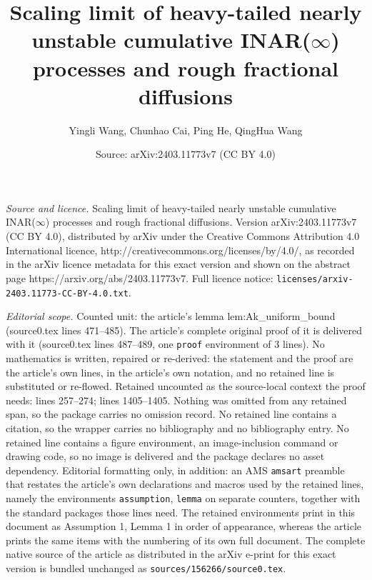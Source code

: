 \documentclass[10pt,a4paper]{amsart}
\title{Scaling limit of heavy-tailed nearly unstable cumulative INAR($\infty$) processes and rough fractional diffusions}
\author{Yingli Wang, Chunhao Cai, Ping He, QingHua Wang}
\date{Source: arXiv:2403.11773v7 (CC BY 4.0)}
\begin{document}
\maketitle

\noindent\emph{Source and licence.} Scaling limit of heavy-tailed nearly unstable cumulative INAR($\infty$) processes and rough fractional diffusions. Version arXiv:2403.11773v7 (CC BY 4.0), distributed by arXiv under the Creative Commons Attribution 4.0 International licence, http://creativecommons.org/licenses/by/4.0/, as recorded in the arXiv licence metadata for this exact version and shown on the abstract page https://arxiv.org/abs/2403.11773v7. Full licence notice: \texttt{licenses/arxiv-2403.11773-CC-BY-4.0.txt}.\par\smallskip

\noindent\textit{Editorial scope.} Counted unit: the article's lemma lem:Ak\_uniform\_bound (source0.tex lines 471--485). The article's complete original proof of it is delivered with it (source0.tex lines 487--489, one \texttt{proof} environment of 3 lines). No mathematics is written, repaired or re-derived: the statement and the proof are the article's own lines, in the article's own notation, and no retained line is substituted or re-flowed.  Retained uncounted as the source-local context the proof needs: lines 257--274; lines 1405--1405.  Nothing was omitted from any retained span, so the package carries no omission record.  No retained line contains a citation, so the wrapper carries no bibliography and no bibliography entry.  No retained line contains a figure environment, an image-inclusion command or drawing code, so no image is delivered and the package declares no asset dependency.  Editorial formatting only, in addition: an AMS \texttt{amsart} preamble that restates the article's own declarations and macros used by the retained lines, namely the environments \texttt{assumption}, \texttt{lemma} on separate counters, together with the standard packages those lines need.  The retained environments print in this document as Assumption 1, Lemma 1 in order of appearance, whereas the article prints the same items with the numbering of its own full document.  The complete native source of the article as distributed in the arXiv e-print for this exact version is bundled unchanged as \texttt{sources/156266/source0.tex}.
\end{document}
